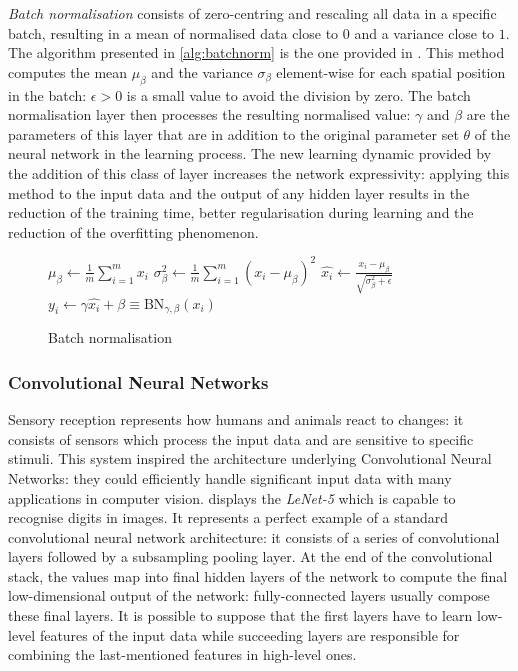 \textit{Batch normalisation} consists of zero-centring and rescaling all data in a specific batch, resulting in a  mean of normalised data close to $0$ and a variance close to $1$. The algorithm presented in \vref{alg:batchnorm} is the one provided in \cite{ioffe2015batch}.
This method computes the mean $\mu_\beta$ and the variance $\sigma_\beta$  element-wise for each spatial position in the batch: $\epsilon > 0$ is a small value to avoid the division by zero.
The batch normalisation layer then processes the resulting normalised value: $\gamma$ and $\beta$ are the parameters of this layer that are in addition to the original parameter set $\theta$ of the neural network in the learning process.
The new learning dynamic provided by the addition of this class of layer increases the network expressivity: applying this method to the input data and the output of any hidden layer results in the reduction of the training time, better regularisation during learning and the reduction of the overfitting phenomenon.
\begin{figure}
	\begin{algorithm}[H]
		\SetAlgoLined
		\DontPrintSemicolon
		\LinesNumbered
		$\mu_\beta \leftarrow \frac{1}{m} \sum_{i=1}^{m} x_i $ 
		$\sigma_\beta^2 \leftarrow \frac{1}{m} \sum_{i=1}^{m} (x_i-\mu_\beta)^2 $ 
		$\hat{x_i} \leftarrow \frac{x_i - \mu_\beta}{\sqrt{\sigma^2_\beta + \epsilon}} $
		$y_i \leftarrow \gamma \hat{x_i} + \beta \equiv \text{BN}_{\gamma, \beta}(x_i)$
		\caption{Batch normalisation}
		\label{alg:batchnorm}
	\end{algorithm}
\end{figure}

\subsubsection{Convolutional Neural Networks}

Sensory reception represents how humans and animals react to changes: it consists of sensors which process the input data and are sensitive to specific stimuli.
This system inspired the architecture underlying Convolutional Neural Networks: they could efficiently handle significant input data with many applications in computer vision.
 displays the \textit{LeNet-5} \cite{lecun1998gradient} which is capable to recognise digits in images. It represents a perfect example of a standard convolutional neural network architecture: it consists of a series of convolutional layers followed by a subsampling pooling layer.
At the end of the convolutional stack, the values map into final hidden layers of the network to compute the final low-dimensional output of the network: fully-connected layers usually compose these final layers.
It is possible to suppose that the first layers have to learn low-level features of the input data while succeeding layers are responsible for combining the last-mentioned features in high-level ones.

